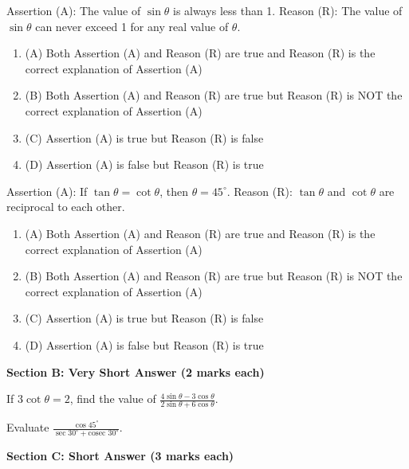 \documentclass[12pt,a4paper]{exam}
\begin{document}
\begin{questions}
\question[1] Assertion (A): The value of $\sin \theta$ is always less than 1. Reason (R): The value of $\sin \theta$ can never exceed 1 for any real value of $\theta$.
\begin{enumerate}[label=(\Alph*)]
  \item (A) Both Assertion (A) and Reason (R) are true and Reason (R) is the correct explanation of Assertion (A)
  \item (B) Both Assertion (A) and Reason (R) are true but Reason (R) is NOT the correct explanation of Assertion (A)
  \item (C) Assertion (A) is true but Reason (R) is false
  \item (D) Assertion (A) is false but Reason (R) is true
\end{enumerate}
\vspace{0.15cm}

\question[1] Assertion (A): If $\tan \theta = \cot \theta$, then $\theta = 45^\circ$. Reason (R): $\tan \theta$ and $\cot \theta$ are reciprocal to each other.
\begin{enumerate}[label=(\Alph*)]
  \item (A) Both Assertion (A) and Reason (R) are true and Reason (R) is the correct explanation of Assertion (A)
  \item (B) Both Assertion (A) and Reason (R) are true but Reason (R) is NOT the correct explanation of Assertion (A)
  \item (C) Assertion (A) is true but Reason (R) is false
  \item (D) Assertion (A) is false but Reason (R) is true
\end{enumerate}
\vspace{0.15cm}

\end{questions}
\bigskip
\noindent\textbf{\large Section B: Very Short Answer (2 marks each)}

\begin{questions}
\question[2] If $3 \cot \theta = 2$, find the value of $\frac{4 \sin \theta - 3 \cos \theta}{2 \sin \theta + 6 \cos \theta}$.
\vspace{0.15cm}

\question[2] Evaluate $\frac{\cos 45^\circ}{\sec 30^\circ + \text{cosec } 30^\circ}$.
\vspace{0.15cm}

\end{questions}
\bigskip
\noindent\textbf{\large Section C: Short Answer (3 marks each)}
\end{document}
